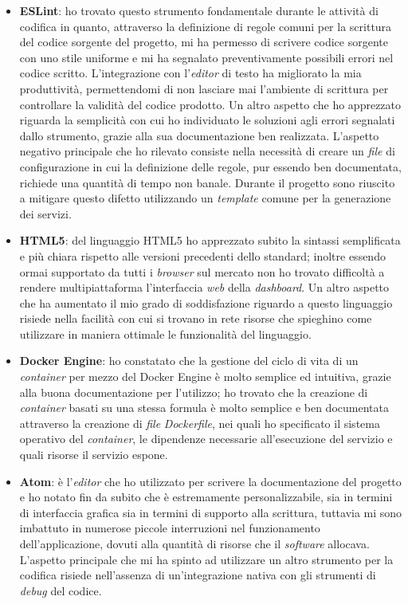 \begin{itemize}
  \item \textbf{ESLint}: ho trovato questo strumento fondamentale durante le attività di codifica in quanto, attraverso la definizione di regole comuni per la scrittura del codice sorgente del progetto, mi ha permesso di scrivere codice sorgente con uno stile uniforme e mi ha segnalato preventivamente possibili errori nel codice scritto. L'integrazione con l'\emph{editor} di testo ha migliorato la mia produttività, permettendomi di non lasciare mai l'ambiente di scrittura per controllare la validità del codice prodotto. Un altro aspetto che ho apprezzato riguarda la semplicità con cui ho individuato le soluzioni agli errori segnalati dallo strumento, grazie alla sua documentazione ben realizzata. L'aspetto negativo principale che ho rilevato consiste nella necessità di creare un \emph{file} di configurazione in cui la definizione delle regole, pur essendo ben documentata, richiede una quantità di tempo non banale. Durante il progetto sono riuscito a mitigare questo difetto utilizzando un \emph{template} comune per la generazione dei servizi.
  \item \textbf{HTML5}: del linguaggio HTML5 ho apprezzato subito la sintassi semplificata e più chiara rispetto alle versioni precedenti dello standard; inoltre essendo ormai supportato da tutti i \emph{browser} sul mercato non ho trovato difficoltà a rendere multipiattaforma l'interfaccia \emph{web} della \emph{dashboard}. Un altro aspetto che ha aumentato il mio grado di soddisfazione riguardo a questo linguaggio risiede nella facilità con cui si trovano in rete risorse che spieghino come utilizzare in maniera ottimale le funzionalità del linguaggio.
  \item \textbf{Docker Engine}: ho constatato che la gestione del ciclo di vita di un \emph{container} per mezzo del Docker Engine è molto semplice ed intuitiva, grazie alla buona documentazione per l'utilizzo; ho trovato che la creazione di \emph{container} basati su una stessa formula è molto semplice e ben documentata attraverso la creazione di \emph{file} \emph{Dockerfile}, nei quali ho specificato il sistema operativo del \emph{container}, le dipendenze necessarie all'esecuzione del servizio e quali risorse il servizio espone.
  \item \textbf{Atom}: è l'\emph{editor} che ho utilizzato per scrivere la documentazione del progetto e ho notato fin da subito che è estremamente personalizzabile, sia in termini di interfaccia grafica sia in termini di supporto alla scrittura, tuttavia mi sono imbattuto in numerose piccole interruzioni nel funzionamento dell'applicazione, dovuti alla quantità di risorse che il \emph{software} allocava. L'aspetto principale che mi ha spinto ad utilizzare un altro strumento per la codifica risiede nell'assenza di un'integrazione nativa con gli strumenti di \emph{debug} del codice.
\end{itemize}

